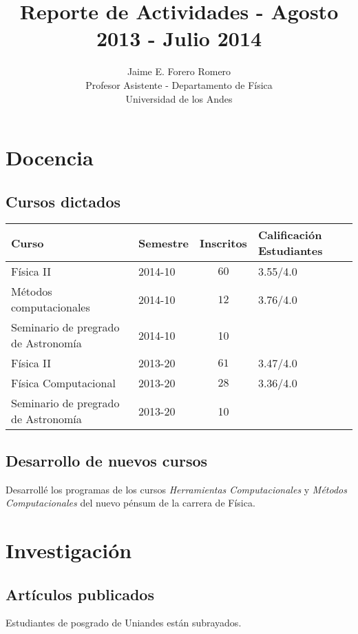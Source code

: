\documentclass{article}
\title{Reporte de Actividades - Agosto 2013 - Julio 2014}
\author{Jaime E. Forero Romero\\Profesor Asistente - Departamento de
  F\'isica\\Universidad de los Andes}
\begin{document}
\maketitle
\tableofcontents
\newpage

\section{Docencia}

\subsection{Cursos dictados}
\begin{tabular}{p{6.0cm} l c p{2cm}}\hline
Curso & Semestre & Inscritos & Calificaci\'on Estudiantes\\\hline
F\'isica II & 2014-10 & $60$  & 3.55/4.0\\
M\'etodos computacionales & 2014-10 & $12$ & 3.76/4.0\\
Seminario de pregrado de Astronom\'ia & 2014-10 & 10 & \\\hline
F\'isica II & 2013-20 & $61$ & 3.47/4.0\\
F\'isica Computacional & 2013-20 & $28$ & 3.36/4.0\\
Seminario de pregrado de Astronom\'ia & 2013-20 & 10 & \\\hline
\end{tabular}

\subsection{Desarrollo de nuevos cursos}
Desarroll\'e los programas de los cursos \emph{Herramientas
  Computacionales} y \emph{M\'etodos Computacionales} del nuevo
p\'ensum de la carrera de F\'isica.



\section{Investigaci\'on}

\subsection{Art\'iculos publicados}
Estudiantes de posgrado de Uniandes est\'an subrayados.
\end{document}
